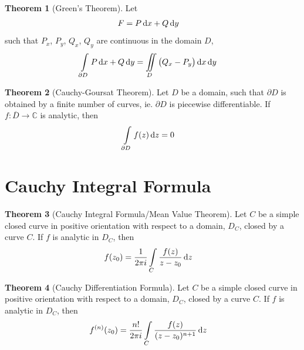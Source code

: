 \documentclass[titlepage, fleqn, a4paper, 12pt, twoside]{article}
\theoremstyle{definition}
\theoremstyle{theorem}
\newtheorem{theorem}{Theorem}
\begin{document}
\begin{theorem}[Green's Theorem]
	Let
	\begin{align*}
		F & = P \dif x + Q \dif y
	\end{align*}
	such that $P_x$, $P_y$, $Q_x$, $Q_y$ are continuous in the domain $D$,
	\begin{align*}
		\int\limits_{\partial D} P \dif x + Q \dif y & = \iint\limits_{D} \left( Q_x - P_y \right) \dif x \dif y
	\end{align*}
	\label{thm:Green's_Theorem}
\end{theorem}

\begin{theorem}[Cauchy-Goursat Theorem]
	Let $D$ be a domain, such that $\partial D$ is obtained by a finite number of curves, ie. $\partial D$ is piecewise differentiable.
	If $f : \overline{D} \to \mathbb{C}$ is analytic, then
	\begin{align*}
		\int\limits_{\partial D} f(z) \dif z & = 0
	\end{align*}
	\label{thm:Cauchy-Goursat_Theorem}
\end{theorem}

\section{Cauchy Integral Formula}

\begin{theorem}[Cauchy Integral Formula/Mean Value Theorem]
	Let $C$ be a simple closed curve in positive orientation with respect to a domain, $D_C$, closed by a curve $C$.
	If $f$ is analytic in $D_C$, then
	\begin{align*}
		f(z_0) & = \frac{1}{2 \pi i} \int\limits_{C} \frac{f(z)}{z - z_0} \dif z
	\end{align*}
	\label{thm:Cauchy_Integral_Formula/Mean_Value_Theorem}
\end{theorem}

\begin{theorem}[Cauchy Differentiation Formula]
	Let $C$ be a simple closed curve in positive orientation with respect to a domain, $D_C$, closed by a curve $C$.
	If $f$ is analytic in $D_C$, then
	\begin{align*}
		f^{(n)}(z_0) & = \frac{n!}{2 \pi i} \int\limits_{C} \frac{f(z)}{(z - z_0)^{n + 1}} \dif z
	\end{align*}
	\label{thm:Cauchy_Differentiation_Formula}
\end{theorem}
\end{document}
